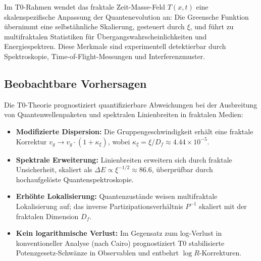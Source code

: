 	Im T0-Rahmen wendet das fraktale Zeit-Masse-Feld $T(x,t)$ eine skalenspezifische Anpassung der Quantenevolution an: Die Greensche Funktion übernimmt eine selbstähnliche Skalierung, gesteuert durch $\xi$, und führt zu multifraktalen Statistiken für Übergangswahrscheinlichkeiten und Energiespektren. Diese Merkmale sind experimentell detektierbar durch Spektroskopie, Time-of-Flight-Messungen und Interferenzmuster.
	
	\subsection{Beobachtbare Vorhersagen}
	
	Die T0-Theorie prognostiziert quantifizierbare Abweichungen bei der Ausbreitung von Quantenwellenpaketen und spektralen Linienbreiten in fraktalen Medien:
	
	\begin{itemize}
		\item \textbf{Modifizierte Dispersion:} Die Gruppengeschwindigkeit erhält eine fraktale Korrektur $v_g \to v_g \cdot (1 + \kappa_\xi)$, wobei $\kappa_\xi = \xi / D_f \approx 4.44 \times 10^{-5}$.
		\item \textbf{Spektrale Erweiterung:} Linienbreiten erweitern sich durch fraktale Unsicherheit, skaliert als $\Delta E \propto \xi^{-1/2} \approx 86.6$, überprüfbar durch hochaufgelöste Quantenspektroskopie.
		\item \textbf{Erhöhte Lokalisierung:} Quantenzustände weisen multifraktale Lokalisierung auf; das inverse Partizipationsverhältnis $P^{-1}$ skaliert mit der fraktalen Dimension $D_f$.
		\item \textbf{Kein logarithmische Verlust:} Im Gegensatz zum log-Verlust in konventioneller Analyse (nach Cairo) prognostiziert T0 stabilisierte Potenzgesetz-Schwänze in Observablen und entbehrt $\log R$-Korrekturen.
	\end{itemize}
	
	\begin{table}[htbp]
		\centering
		\caption{Beobachtbare Vorhersagen der T0 in fraktalen Quantensystemen}
		\label{tab:t0_predictions}
	\end{table}
	
